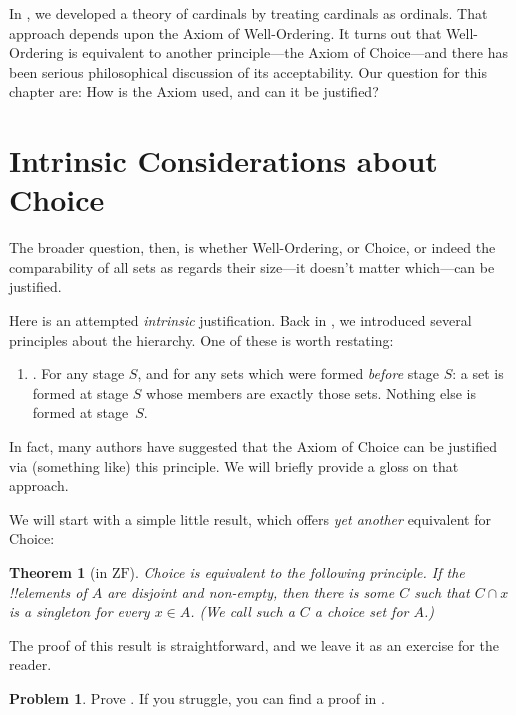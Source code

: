 \documentclass[10pt,a4paper]{article}
\makeatletter
\theoremstyle{plain}
\newtheorem{thm}{Theorem}[section]
\theoremstyle{definition}
\newtheorem{prob}{Problem}[section]
\theoremstyle{remark}
\newcommand*{\olfileid}[3]{}
\newcommand*{\olsection}[1]{\section*{#1}}
\newcommand*{\ollabel}[1]{\label{#1}}
\newcommand{\olref}{\@ifnextchar[{\olref@i}{\olref@final}}
\def\olref@i[#1]{\@ifnextchar[{\olref@ii}{\olref@final}}
\def\olref@ii[#1]{\@ifnextchar[{\olref@iii}{\olref@final}}
\def\olref@iii[#1]{\olref@final}
\def\olref@final#1{\ref{#1}}
\providecommand{\ZF}{\mathrm{ZF}}
\makeatother
\begin{document}
In , we
developed a theory of cardinals by treating cardinals as ordinals.
That approach depends upon the Axiom of Well-Ordering. It turns out
that Well-Ordering is equivalent to another principle---the Axiom of
Choice---and there has been serious philosophical discussion of its
acceptability. Our question for this chapter are: How is the Axiom
used, and can it be justified?



\olfileid{sth}{choice}{justifications}
\olsection{Intrinsic Considerations about Choice}

The broader question, then, is whether Well-Ordering, or Choice, or
indeed the comparability of all sets as regards their size---it
doesn't matter which---can be justified. 

Here is an attempted \emph{intrinsic} justification. Back in
\olref[z][story]{sec}, we introduced several principles
about the hierarchy. One of these is worth restating:
\begin{enumerate}
	\item[] \stagesacc. For any stage $S$, and for any sets which were
	formed \emph{before} stage $S$: a set is formed at stage $S$ whose
	members are exactly those sets. Nothing else is formed at
	stage~$S$. 
\end{enumerate}
In fact, many authors have suggested that the Axiom of Choice can be
justified via (something like) this principle. We will briefly provide
a gloss on that approach.

We will start with a simple little result, which offers \emph{yet
another} equivalent for Choice:

\begin{thm}[in $\ZF$]\ollabel{choiceset}
Choice is equivalent to the following principle. If the !!{element}s
of $A$ are disjoint and non-empty, then there is some $C$ such that $C
\cap x$ is a singleton for every $x \in A$. (We call such a $C$ a
{choice set} for $A$.)
\end{thm}

The proof of this result is straightforward, and we leave it as an
exercise for the reader. 

\begin{prob}
Prove \olref[sth][choice][justifications]{choiceset}. If you struggle,
you can find a proof in \cite[pp.~242--3]{Potter2004}.
\end{prob}
\end{document}
